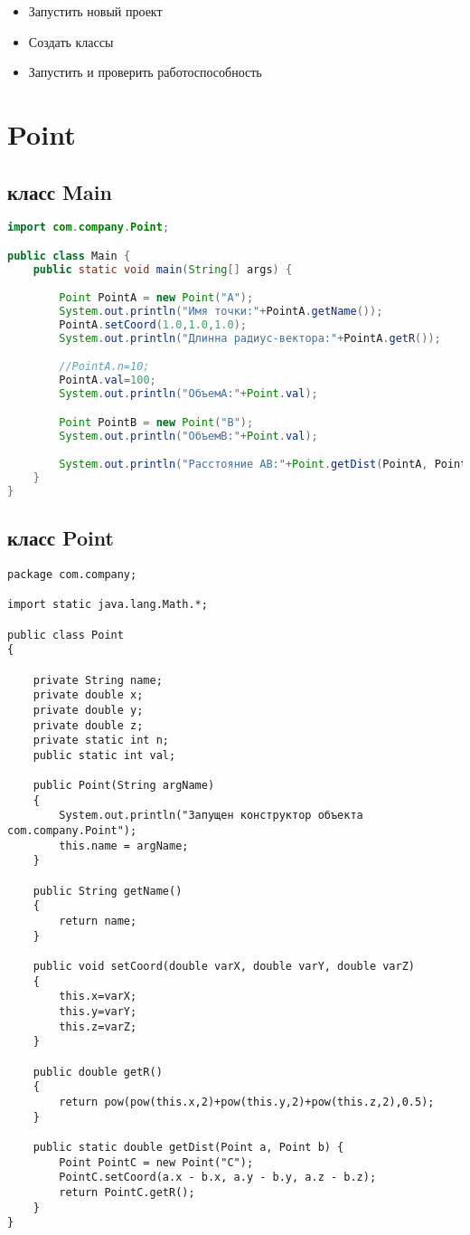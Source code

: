 \documentclass[12pt,a4paper,oneside,titlepage]{article}
\begin{document}
\begin{itemize}
  \item
        Запустить новый проект
  \item
        Создать классы
  \item
        Запустить и проверить работоспособность
\end{itemize}

\section{Point}

\subsection{класс Main}
\begin{lstlisting}[language=java]
import com.company.Point;

public class Main {
    public static void main(String[] args) {

        Point PointA = new Point("A");
        System.out.println("Имя точки:"+PointA.getName());
        PointA.setCoord(1.0,1.0,1.0);
        System.out.println("Длинна радиус-вектора:"+PointA.getR());

        //PointA.n=10;
        PointA.val=100;
        System.out.println("ОбъемА:"+Point.val);

        Point PointB = new Point("B");
        System.out.println("ОбъемB:"+Point.val);

        System.out.println("Расстояние AB:"+Point.getDist(PointA, PointB));
    }
}
\end{lstlisting}

\subsection{класс Point}
\begin{lstlisting}
package com.company;

import static java.lang.Math.*;

public class Point
{

    private String name;
    private double x;
    private double y;
    private double z;
    private static int n;
    public static int val;

    public Point(String argName)
    {
        System.out.println("Запущен конструктор объекта com.company.Point");
        this.name = argName;
    }

    public String getName()
    {
        return name;
    }

    public void setCoord(double varX, double varY, double varZ)
    {
        this.x=varX;
        this.y=varY;
        this.z=varZ;
    }

    public double getR()
    {
        return pow(pow(this.x,2)+pow(this.y,2)+pow(this.z,2),0.5);
    }

    public static double getDist(Point a, Point b) {
        Point PointC = new Point("C");
        PointC.setCoord(a.x - b.x, a.y - b.y, a.z - b.z);
        return PointC.getR();
    }
}
\end{lstlisting}
\end{document}
